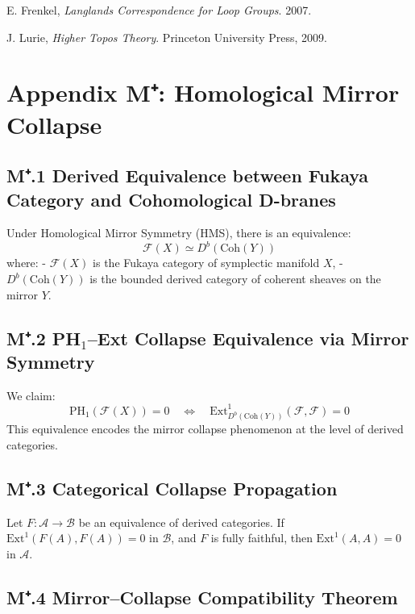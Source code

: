 \documentclass[11pt]{article}
\begin{document}
\begin{axiom}
\begin{axiom}
{{\begin{thebibliography}{9}
E. Frenkel,  
\textit{Langlands Correspondence for Loop Groups}. 2007.

J. Lurie,  
\textit{Higher Topos Theory}. Princeton University Press, 2009.
\end{thebibliography}




\section*{Appendix M⁺: Homological Mirror Collapse}

\subsection*{M⁺.1 Derived Equivalence between Fukaya Category and Cohomological D-branes}

Under Homological Mirror Symmetry (HMS), there is an equivalence:
\[
\mathcal{F}(X) \simeq D^b(\text{Coh}(Y))
\]
where:
- $\mathcal{F}(X)$ is the Fukaya category of symplectic manifold $X$,
- $D^b(\text{Coh}(Y))$ is the bounded derived category of coherent sheaves on the mirror $Y$.

\subsection*{M⁺.2 PH$_1$–Ext Collapse Equivalence via Mirror Symmetry}

We claim:
\[
\mathrm{PH}_1(\mathcal{F}(X)) = 0 \quad \Longleftrightarrow \quad \mathrm{Ext}^1_{D^b(\text{Coh}(Y))}(\mathcal{F}, \mathcal{F}) = 0
\]
This equivalence encodes the mirror collapse phenomenon at the level of derived categories.

\subsection*{M⁺.3 Categorical Collapse Propagation}

Let $F: \mathcal{A} \to \mathcal{B}$ be an equivalence of derived categories.  
If $\mathrm{Ext}^1(F(A), F(A)) = 0$ in $\mathcal{B}$, and $F$ is fully faithful,  
then $\mathrm{Ext}^1(A, A) = 0$ in $\mathcal{A}$.

\subsection*{M⁺.4 Mirror–Collapse Compatibility Theorem}

}}
\end{axiom}
\end{axiom}
\end{document}
